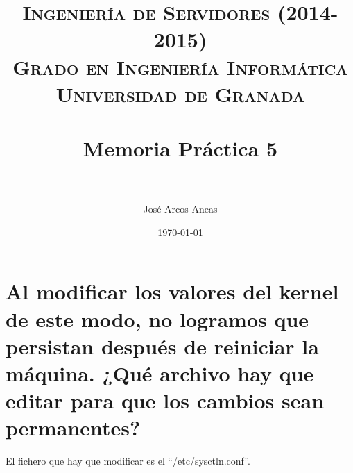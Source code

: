 


\title{	
\normalfont \normalsize 
\textsc{{\bf Ingeniería de Servidores (2014-2015)} \\ Grado en Ingeniería Informática \\ Universidad de Granada} \\ [25pt] %
\horrule{0.5pt} \\[0.4cm] %
\huge Memoria Práctica 5 \\ %
\horrule{2pt} \\[0.5cm] %
}

\author{José Arcos Aneas} %

\date{\normalsize\today} %




\maketitle %

\newpage %

\tableofcontents %

\newpage


\section{Al modificar los valores del kernel de este modo, no logramos que persistan después de reiniciar la máquina. ¿Qué archivo hay que editar para que los cambios sean permanentes?}

El fichero que hay que modificar es el “/etc/sysctln.conf”.

